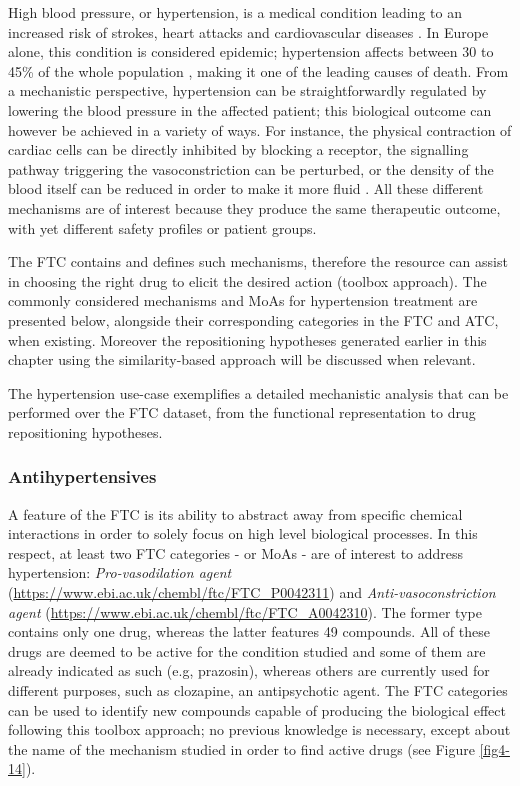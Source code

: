 High blood pressure, or hypertension, is a medical condition leading to an increased risk of strokes, heart attacks and cardiovascular diseases \citep{law2003lowering}. In Europe alone, this condition is considered epidemic; hypertension affects between 30 to 45\% of the whole population \citep{swedberg2005task}, making it one of the leading causes of death. From a mechanistic perspective, hypertension can be straightforwardly regulated by lowering the blood pressure in the affected patient; this biological outcome can however be achieved in a variety of ways. For instance, the physical contraction of cardiac cells can be directly inhibited by blocking a receptor, the signalling pathway triggering the vasoconstriction can be perturbed, or the density of the blood itself can be reduced in order to make it more fluid \citep{swedberg2005task}. All these different mechanisms are of interest because they produce the same therapeutic outcome, with yet different safety profiles or patient groups.

The FTC contains and defines such mechanisms, therefore the resource can assist in choosing the right drug to elicit the desired action (toolbox approach). The commonly considered mechanisms and MoAs for hypertension treatment are presented below, alongside their corresponding categories in the FTC and ATC, when existing. Moreover the repositioning hypotheses generated earlier in this chapter using the similarity-based approach will be discussed when relevant.

The hypertension use-case exemplifies a detailed mechanistic analysis that can be performed over the FTC dataset, from the functional representation to drug repositioning hypotheses.

\subsubsection{Antihypertensives}
\label{sec:Antihypertensives}
A feature of the FTC is its ability to abstract away from specific chemical interactions in order to solely focus on high level biological processes. In this respect, at least two FTC categories - or MoAs - are of interest to address hypertension: \emph{Pro-vasodilation agent} (\url{https://www.ebi.ac.uk/chembl/ftc/FTC\_P0042311}) and \emph{Anti-vasoconstriction agent} (\url{https://www.ebi.ac.uk/chembl/ftc/FTC\_A0042310}). The former type contains only one drug, whereas the latter features 49 compounds. All of these drugs are deemed to be active for the condition studied and some of them are already indicated as such (e.g, prazosin), whereas others are currently used for different purposes, such as clozapine, an antipsychotic agent. The FTC categories can be used to identify new compounds capable of producing the biological effect following this toolbox approach; no previous knowledge is necessary, except about the name of the mechanism studied in order to find active drugs (see Figure \ref{fig4-14}).

